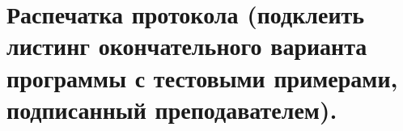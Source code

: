 \section{Распечатка протокола \textnormal{\small (подклеить листинг окончательного варианта программы с тестовыми примерами, подписанный
     \singlespace преподавателем).}}

\newpage